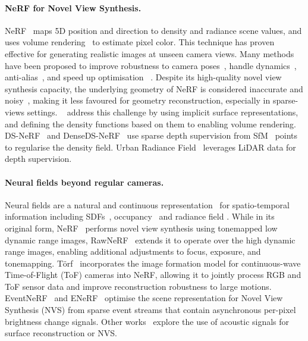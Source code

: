 \paragraph{NeRF for Novel View Synthesis.}
NeRF~\cite{mildenhall2020nerf} maps 5D position and direction to density and radiance scene values, and uses volume rendering~\cite{max1995optical,max2005local} to estimate pixel color. This technique has proven effective for generating realistic images at unseen camera views. Many methods have been proposed to improve robustness to camera poses~\cite{lin2021barf,chng2022garf}, handle dynamics~\cite{ost2021neural,pumarola2021d}, anti-alias~\cite{zhang2020nerf++,barron2021mip,barron2022mip}, and speed up optimisation~\cite{liu2020neural,yu2021plenoxels,muller2022instant} \etc. Despite its high-quality novel view synthesis capacity, the underlying geometry of NeRF is considered inaccurate and noisy~\cite{oechsle2021unisurf}, making it less favoured for geometry reconstruction, especially in sparse-views settings. ~\cite{oechsle2021unisurf,yariv2021volume,wang2021neus} address this challenge by using implicit surface representations, and defining the density functions based on them to enabling volume rendering. DS-NeRF~\cite{deng2021depth} and DenseDS-NeRF~\cite{roessle2021dense} use sparse depth supervision from SfM~\cite{schoenberger2016sfm} points to regularise the density field. Urban Radiance Field~\cite{rematas2021urban} leverages LiDAR data for depth supervision. %

\paragraph{Neural fields beyond regular cameras.}
Neural fields are a natural and continuous representation~\cite{xie2022neural} for spatio-temporal information including SDFs~\cite{park2019deepsdf}, occupancy~\cite{mescheder2019occupancy} and radiance field \cite{mildenhall2020nerf} \etc. 
While in its original form, NeRF~\cite{mildenhall2020nerf} performs novel view synthesis using tonemapped low dynamic range images, RawNeRF~\cite{mildenhall2022nerf} extends it to operate over the high dynamic range images, enabling additional adjustments to focus, exposure, and tonemapping. T{\"o}rf~\cite{attal2021torf} incorporates the image formation model for continuous-wave Time-of-Flight (ToF) cameras into NeRF, allowing it to jointly process RGB and ToF sensor data and improve reconstruction robustness to large motions. EventNeRF~\cite{rudnev2022eventnerf} and ENeRF~\cite{klenk2022nerf} optimise the scene representation for Novel View Synthesis (NVS) from sparse event streams that contain asynchronous per-pixel brightness change signals. Other works~\cite{qadri2022neural,luo2022learning} explore the use of acoustic signals for surface reconstruction or NVS. 